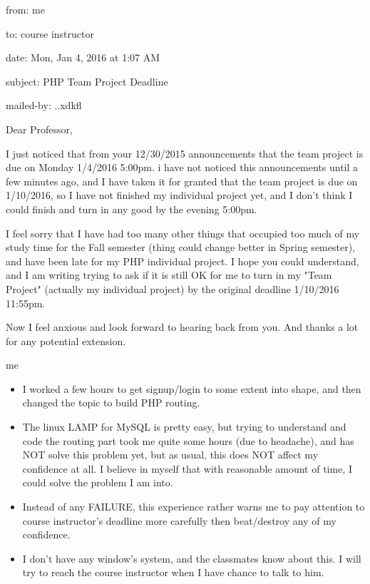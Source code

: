 \documentclass[9pt,b5paper]{article}
\begin{document}
from:        me

to:        course instructor

date:        Mon, Jan 4, 2016 at 1:07 AM

subject:        PHP Team Project Deadline

mailed-by:        ..xdkfl

Dear Professor, 

I just noticed that from your 12/30/2015 announcements that the team project is due on Monday 1/4/2016 5:00pm. i have not noticed this announcements until a few minutes ago, and I have taken it for granted that the team project is due on 1/10/2016, so I have not finished my individual project yet, and I don't think I could finish and turn in any good by the evening 5:00pm. 

I feel sorry that I have had too many other things that occupied too much of my study time for the Fall semester (thing could change better in Spring semester), and have been late for my PHP individual project. I hope you could understand, and I am writing trying to ask if it is still OK for me to turn in my "Team Project" (actually my individual project) by the original deadline 1/10/2016 11:55pm. 

Now I feel anxious and look forward to hearing back from you. And thanks a lot for any potential extension. 

me

\begin{itemize}
\item I worked a few hours to get signup/login to some extent into shape, and then changed the topic to build PHP routing.
\item The linux LAMP for MySQL is pretty easy, but trying to understand and code the routing part took me quite some hours (due to headache), and has NOT solve this problem yet, but as usual, this does NOT affect my confidence at all. I believe in myself that with reasonable amount of time, I could solve the problem I am into.
\item Instead of any FAILURE, this experience rather warns me to pay attention to course instructor's deadline more carefully then beat/destroy any of my confidence.
\item I don't have any window's system, and the classmates know about this. I will try to reach the course instructor when I have chance to talk to him.
\end{itemize}
\end{document}
